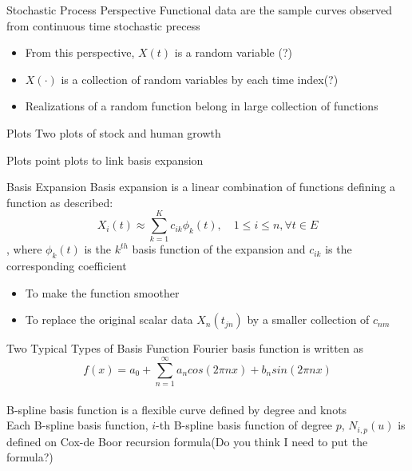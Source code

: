 \documentclass{beamer}
\begin{document}
	\begin{frame}{Stochastic Process Perspective}
		Functional data are the sample curves observed from continuous time stochastic precess\\
		\begin{itemize}
			\item From this perspective, $X(t)$ is a random variable (?)\\
			\item $X(\cdot)$ is a collection of random variables by each time index(?)\\
			\item Realizations of a random function belong in large collection of functions
		\end{itemize}		
	\end{frame}
	
	\begin{frame}{Plots}
		Two plots of stock and human growth
	\end{frame}
	
	\begin{frame}{Plots}
		point plots to link basis expansion
	\end{frame}
	\begin{frame}{Basis Expansion}
		Basis expansion is a linear combination of functions defining a function as described:
		$$X_{i}(t) \approx \sum_{k=1}^{K} c_{ik}\phi_{k}(t), \quad 1\leq i \leq n, \forall t \in E$$
		, where $\phi_{k}(t)$ is the $k^{th}$ basis function of the expansion and $c_{ik}$ is the corresponding coefficient
		\begin{itemize}
			\item To make the function smoother
			\item To replace the original scalar data $X_{n}(t_{jn})$ by a smaller collection of $c_{nm}$
		\end{itemize}		
	\end{frame}
	
	\begin{frame}{Two Typical Types of Basis Function}
		Fourier basis function is written as
		$$f(x) = a_{0} + \sum_{n=1}^{\infty}a_{n}cos(2\pi nx) + b_{n}sin(2\pi nx)$$	\\
		\vspace{2\baselineskip}
		B-spline basis function is a flexible curve defined by degree and knots \\
		Each B-spline basis function, $i$-th B-spline basis function of degree $p$, $N_{i,p}(u)$ is defined on Cox-de Boor recursion formula(Do you think I need to put the formula?)
	\end{frame}
	
\end{document}
